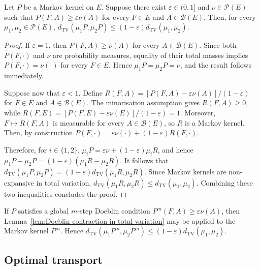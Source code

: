 \begin{lemma}\label{lem:Doeblin contraction in total variation}
Let \(P\) be a Markov kernel on \(E\). Suppose there exist \(\varepsilon\in(0,1]\) and \(\nu\in\mathcal P(E)\) such that \(P(F,A)\geqslant\varepsilon\nu(A)\) for every \(F\in E\) and \(A\in\mathcal B(E)\). Then, for every \(\mu_1,\mu_2\in\mathcal P(E)\), \(d_{\mathrm{TV}}(\mu_1P,\mu_2P)\leqslant(1-\varepsilon)d_{\mathrm{TV}}(\mu_1,\mu_2)\).
\end{lemma}

\begin{proof}
If \(\varepsilon=1\), then \(P(F,A)\geqslant\nu(A)\) for every \(A\in\mathcal B(E)\). Since both \(P(F,\cdot)\) and \(\nu\) are probability measures, equality of their total masses implies \(P(F,\cdot)=\nu(\cdot)\) for every \(F\in E\). Hence \(\mu_1P=\mu_2P=\nu\), and the result follows immediately.

Suppose now that \(\varepsilon<1\). Define \(R(F,A)=[P(F,A)-\varepsilon\nu(A)]/(1-\varepsilon)\) for \(F\in E\) and \(A\in\mathcal B(E)\). The minorisation assumption gives \(R(F,A)\geqslant0\), while \(R(F,E)=[P(F,E)-\varepsilon\nu(E)]/(1-\varepsilon)=1\). Moreover, \(F\mapsto R(F,A)\) is measurable for every \(A\in\mathcal B(E)\), so \(R\) is a Markov kernel. Then, by construction \(P(F,\cdot)=\varepsilon\nu(\cdot)+(1-\varepsilon)R(F,\cdot)\).

Therefore, for \(i\in\{1,2\}\), \(\mu_iP=\varepsilon\nu+(1-\varepsilon)\mu_iR\), and hence \(\mu_1P-\mu_2P=(1-\varepsilon)(\mu_1R-\mu_2R)\). It follows that \(d_{\mathrm{TV}}(\mu_1P,\mu_2P)=(1-\varepsilon)d_{\mathrm{TV}}(\mu_1R,\mu_2R)\). Since Markov kernels are non-expansive in total variation, \(d_{\mathrm{TV}}(\mu_1R,\mu_2R)\leqslant d_{\mathrm{TV}}(\mu_1,\mu_2)\). Combining these two inequalities concludes the proof.
\end{proof}

\begin{remark}
If \(P\) satisfies a global \(m\)-step Doeblin condition \(P^m(F,A)\geqslant\varepsilon\nu(A)\), then Lemma~\ref{lem:Doeblin contraction in total variation} may be applied to the Markov kernel \(P^m\). Hence \(d_{\mathrm{TV}}(\mu_1P^m,\mu_2P^m)\leqslant(1-\varepsilon)d_{\mathrm{TV}}(\mu_1,\mu_2)\).
\end{remark}


\subsection{Optimal transport}\label{subsec:Optimal transport}

